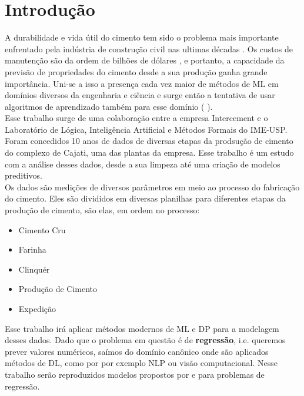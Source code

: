 \chapter{Introdução}
\label{cap:introducao}


A durabilidade e vida útil do cimento tem sido o problema mais importante
enfrentado pela indústria de construção civil nas ultimas décadas
\citep{cementml}. Os custos de manutenção são da ordem de bilhões de dólares \citep{cementnn1}, e portanto, a capacidade da previsão de propriedades do cimento desde a sua produção ganha grande importância. Uni-se a isso a presença cada vez maior de métodos de ML em domínios diversos da engenharia e ciência e surge então a tentativa de usar algoritmos de aprendizado também para esse domínio (\cite{cementnn1} \cite{cementnn2}). \\ 

Esse trabalho surge de uma colaboração entre a empresa Intercement e o Laboratório de Lógica, Inteligência Artificial e Métodos Formais do IME-USP. Foram concedidos 10 anos de dados de diversas etapas da prodsução de cimento do complexo de Cajati, uma das plantas da empresa. Esse trabalho é um estudo com a análise desses dados, desde a sua limpeza até uma criação de modelos preditivos. \\


Os dados são medições de diversos parâmetros em meio ao processo do fabricação do cimento. Eles são divididos em diversas planilhas para diferentes etapas da produção de cimento, são elas, em ordem no processo:

\begin{itemize}
        \item Cimento Cru
        \item Farinha
        \item Clinquér
        \item Produção de Cimento
        \item Expedição
\end{itemize}


Esse trabalho irá aplicar métodos modernos de ML e DP para a modelagem desses dados. Dado que o problema em questão é de \textbf{regressão}, i.e. queremos prever valores numéricos, saímos do domínio canônico onde são aplicados métodos de DL, como por por exemplo NLP ou visão computacional. Nesse trabalho serão reproduzidos modelos propostos por \citet{ubertime} e \citet{energylstm} para problemas de regressão.



